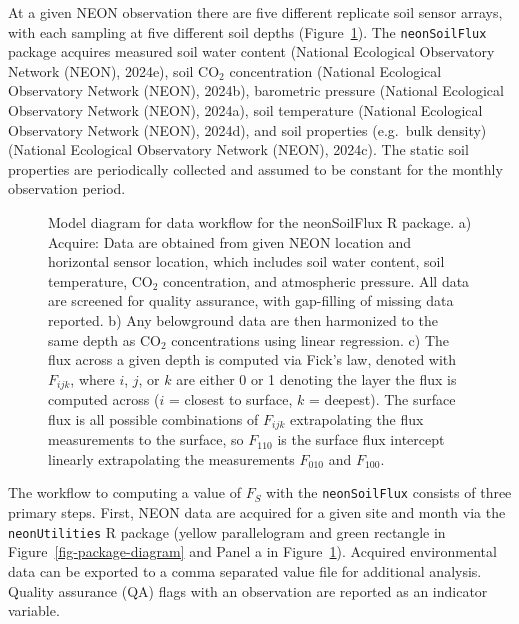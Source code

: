 \documentclass[
  letterpaper,
  DIV=11,
  numbers=noendperiod]{scrartcl}
\begin{document}
At a given NEON observation there are five different replicate soil
sensor arrays, with each sampling at five different soil depths
(Figure~\ref{fig-model-diagram}). The \texttt{neonSoilFlux} package
acquires measured soil water content (National Ecological Observatory
Network (NEON), 2024e), soil CO\(_{2}\) concentration (National
Ecological Observatory Network (NEON), 2024b), barometric pressure
(National Ecological Observatory Network (NEON), 2024a), soil
temperature (National Ecological Observatory Network (NEON), 2024d), and
soil properties (e.g.~bulk density) (National Ecological Observatory
Network (NEON), 2024c). The static soil properties are periodically
collected and assumed to be constant for the monthly observation period.

\begin{figure}


\caption{\label{fig-model-diagram}Model diagram for data workflow for
the neonSoilFlux R package. a) Acquire: Data are obtained from given
NEON location and horizontal sensor location, which includes soil water
content, soil temperature, CO\(_{2}\) concentration, and atmospheric
pressure. All data are screened for quality assurance, with gap-filling
of missing data reported. b) Any belowground data are then harmonized to
the same depth as CO\(_{2}\) concentrations using linear regression. c)
The flux across a given depth is computed via Fick's law, denoted with
\(F_{ijk}\), where \(i\), \(j\), or \(k\) are either 0 or 1 denoting the
layer the flux is computed across (\(i\) = closest to surface, \(k\) =
deepest). The surface flux is all possible combinations of \(F_{ijk}\)
extrapolating the flux measurements to the surface, so \(F_{110}\) is
the surface flux intercept linearly extrapolating the measurements
\(F_{010}\) and \(F_{100}\).}

\end{figure}%

The workflow to computing a value of \(F_{S}\) with the
\texttt{neonSoilFlux} consists of three primary steps. First, NEON data
are acquired for a given site and month via the \texttt{neonUtilities} R
package (yellow parallelogram and green rectangle in
Figure~\ref{fig-package-diagram} and Panel a in
Figure~\ref{fig-model-diagram}). Acquired environmental data can be
exported to a comma separated value file for additional analysis.
Quality assurance (QA) flags with an observation are reported as an
indicator variable.
\end{document}
